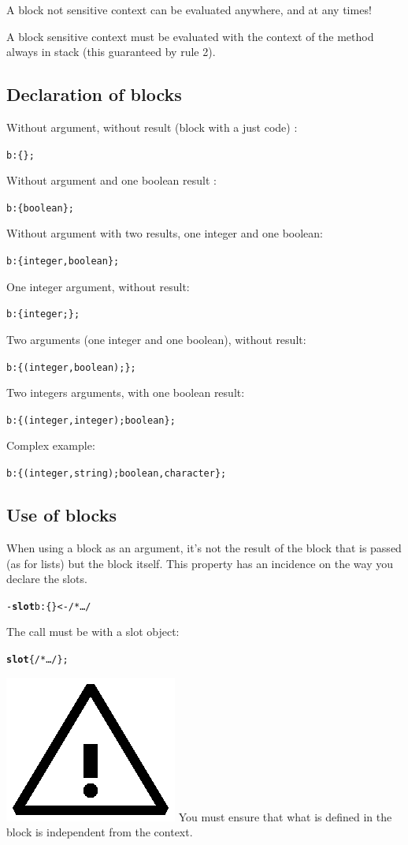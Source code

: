 \documentclass[11pt]{mybook}
\newcommand{\warning}{\includegraphics[scale=0.3]{figures/warning}}
\begin{document}
A block not sensitive context can be evaluated anywhere, and at any times!

A block sensitive context must be evaluated with the context of the method
always in stack (this guaranteed by rule 2).

\subsection{Declaration of blocks}
\label{language_reference:blocks:declaration}
\noindent Without argument, without result (block with a just code) :
\begin{alltt}
  b:{\sc{}\{ \}};         
\end{alltt}

\noindent Without argument and one boolean result :
\begin{alltt}
  b:{\sc{}\{ boolean \}}; 
\end{alltt}

\noindent Without argument with two results, one integer and one boolean:
\begin{alltt}
  b:{\sc{}\{ integer, boolean \}};
\end{alltt} 

\noindent One integer argument, without result:
\begin{alltt}
  b:{\sc{}\{ integer; \}};
\end{alltt} 

\noindent Two arguments (one integer and one boolean), without result:
\begin{alltt}
  b:{\sc{}\{ (integer, boolean); \}};
\end{alltt} 

\noindent Two integers arguments, with one boolean result:
\begin{alltt}
  b:{\sc{}\{ (integer, integer); boolean \}};
\end{alltt} 

\noindent Complex example:
\begin{alltt}
  b:{\sc{}\{ (integer, string); boolean, character \}};
\end{alltt} 

\subsection{Use of blocks}
\label{language_reference:blocks:use}
When using a block as an argument, it's not the result of the block that is passed (as for lists) but the block itself.
This property has an incidence on the way you declare the slots.
\begin{alltt}
  - {\bf{}slot} b:{\sc{}\{ \}} <- /* \ldots */
\end{alltt}
The call must be with a slot object:
\begin{alltt}
  {\bf{}slot} \{/* \ldots */\};
\end{alltt}
\warning{} You must ensure that what is defined in the block is independent from the context.
\end{document}
